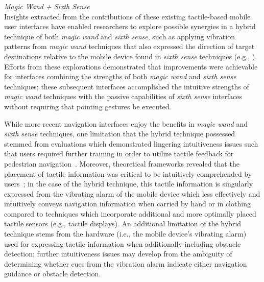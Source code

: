 \documentclass{sigchi}
\begin{document}
\textit{Magic Wand + Sixth Sense}\\
Insights extracted from the contributions of these existing tactile-based mobile user interfaces have enabled researchers to explore possible synergies in a hybrid technique of both \textit{magic wand} and \textit{sixth sense}, such as applying vibration patterns from \textit{magic wand} techniques that also expressed the direction of target destinations relative to the mobile device found in \textit{sixth sense} techniques (e.g., \cite{2010_Magnusson_HAID, 2010_Pielot_MobileHCI, 2011_Pielot_ICMI}).  Efforts from these explorations demonstrated that improvements were achievable for interfaces combining the strengths of both \textit{magic wand} and \textit{sixth sense} techniques; these subsequent interfaces accomplished the intuitive strengths of \textit{magic wand} techniques with the passive capabilities of \textit{sixth sense} interfaces without requiring that pointing gestures be executed.

While more recent navigation interfaces enjoy the benefits in \textit{magic wand} and \textit{sixth sense} techniques, one limitation that the hybrid technique possessed stemmed from evaluations which demonstrated lingering intuitiveness issues such that users required further training in order to utilize tactile feedback for pedestrian navigation~\cite{2012_Pielot_CHI}.  Moreover, theoretical frameworks revealed that the placement of tactile information was critical to be intuitively comprehended by users~\cite{2010_Elliott_IEEEHaptics, 2007_VanErp_Dissertation}; in the case of the hybrid technique, this tactile information is singularly expressed from the vibrating alarm of the mobile device which less effectively and intuitively conveys navigation information when carried by hand or in clothing compared to techniques which incorporate additional and more optimally placed tactile sensors (e.g., tactile displays).  An additional limitation of the hybrid technique stems from the hardware (i.e., the mobile device's vibrating alarm) used for expressing tactile information when additionally including obstacle detection; further intuitiveness issues may develop from the ambiguity of determining whether cues from the vibration alarm indicate either navigation guidance or obstacle detection.
\end{document}

